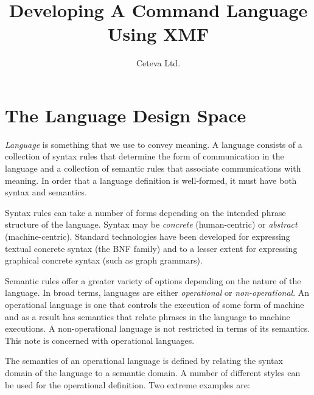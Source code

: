 \documentclass{article}
\title{Developing A Command Language Using XMF}
\author{Ceteva Ltd.}
\begin{document}
\maketitle

\tableofcontents

\section{The Language Design Space}

{\em Language} is something that we use to convey meaning. A language
consists of a collection of syntax rules that determine the form of
communication in the language and a collection of semantic rules that
associate communications with meaning. In order that a language definition
is well-formed, it must have both syntax and semantics.

Syntax rules can take a number of forms depending on the intended phrase 
structure of the language. Syntax may be {\em concrete} (human-centric)
or {\em abstract} (machine-centric). Standard technologies have been
developed for expressing textual concrete syntax (the BNF family) and
to a lesser extent for expressing graphical concrete syntax (such as
graph grammars).

Semantic rules offer a greater variety of options depending on the nature
of the language. In broad terms, languages are either {\em operational}
or {\em non-operational}. An operational language is one that controls
the execution of some form of machine and as a result has semantics
that relate phrases in the language to machine executions. A non-operational 
language is not restricted in terms of its semantics. This note is concerned 
with operational languages. 

The semantics of an operational language is defined by relating the syntax domain
of the language to a semantic domain. A number of different styles can be used
for the operational definition. Two extreme examples are:
\end{document}
